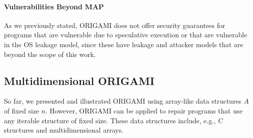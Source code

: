 {\paragraph*{Vulnerabilities Beyond MAP} As we previously stated, ORIGAMI does not offer security guarantees for programs that are vulnerable due to speculative execution or that are vulnerable in the OS leakage model, since these have leakage and attacker models that are beyond the scope of this work.


\subsection{Multidimensional ORIGAMI}
So far, we presented and illustrated ORIGAMI using array-like data structures $A$ of fixed size $n$. However, ORIGAMI can be applied to repair programs that use any iterable structure of fixed size. These data structures include, e.g., C structures and multidimensional arrays. 

}
